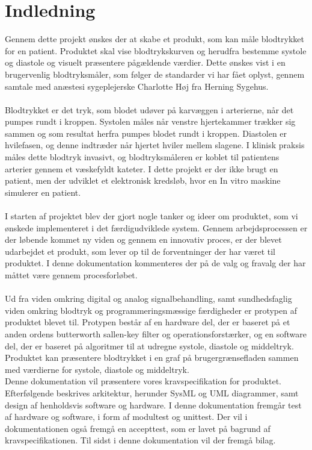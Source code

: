\chapter{Indledning}
Gennem dette projekt ønskes der at skabe et produkt, som kan måle blodtrykket for en patient. Produktet skal vise blodtrykskurven og herudfra bestemme systole og diastole og visuelt præsentere pågældende værdier. Dette ønskes vist i en brugervenlig blodtryksmåler, som følger de standarder vi har fået oplyst, gennem samtale med anæstesi sygeplejerske Charlotte Høj fra Herning Sygehus. 
\\\\
Blodtrykket er det tryk, som blodet udøver på karvæggen i arterierne, når det pumpes rundt i kroppen. Systolen måles når venstre hjertekammer trækker sig sammen og som resultat herfra pumpes blodet rundt i kroppen. Diastolen er hvilefasen, og denne indtræder når hjertet hviler mellem slagene. I klinisk praksis måles dette blodtryk invasivt, og blodtryksmåleren er koblet til patientens arterier gennem et væskefyldt kateter. I dette projekt er der ikke brugt en patient, men der udviklet et elektronisk kredsløb, hvor en In vitro maskine simulerer en patient.
\\\\
I starten af projektet blev der gjort nogle tanker og ideer om produktet, som vi ønskede implementeret i det færdigudviklede system. Gennem arbejdsprocessen er der løbende kommet ny viden og gennem en innovativ proces, er der blevet udarbejdet et produkt, som lever op til de forventninger der har været til produktet. I denne dokumentation kommenteres der på de valg og fravalg der har måttet være gennem procesforløbet.  
\\\\
Ud fra viden omkring digital og analog signalbehandling, samt sundhedsfaglig viden omkring blodtryk og programmeringsmæssige færdigheder er protypen af produktet blevet til. Protypen består af en hardware del, der er baseret på et anden ordens butterworth sallen-key filter og operationsforstærker, og en software del, der er baseret på algoritmer til at udregne systole, diastole og middeltryk. Produktet kan præsentere blodtrykket i en graf på brugergrænsefladen sammen med værdierne for systole, diastole og middeltryk.\\
Denne dokumentation vil præsentere vores kravspecifikation for produktet. Efterfølgende beskrives arkitektur, herunder SysML og UML diagrammer, samt design af henholdsvis software og hardware. I denne dokumentation fremgår test af hardware og software, i form af modultest og unittest. Der vil i dokumentationen også fremgå en accepttest, som er lavet på bagrund af kravspecifikationen. Til sidst i denne dokumentation vil der fremgå bilag. 
